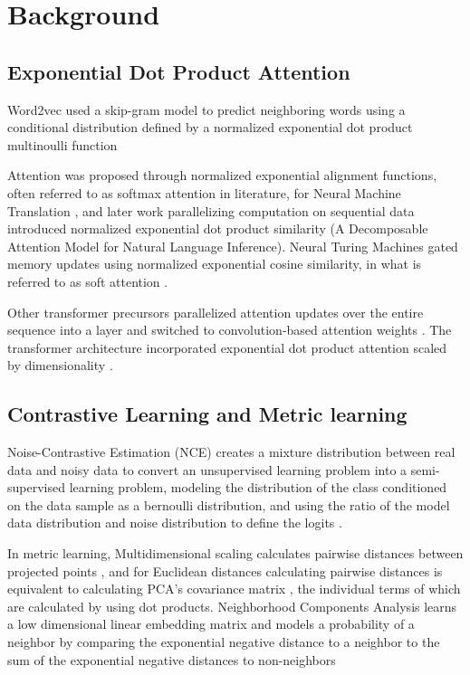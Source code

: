 \documentclass{article}
\begin{document}
\section{Background}
\label{background}

\subsection{Exponential Dot Product Attention}
Word2vec used a skip-gram model to predict neighboring words using a conditional distribution defined by a normalized exponential dot product multinoulli function \cite{DBLP:journals/corr/MikolovSCCD13}

Attention was proposed through normalized exponential alignment functions, often referred to as softmax attention in literature, for Neural Machine Translation \cite{DBLP:journals/corr/Graves13,bahdanau2014neural}, and later work parallelizing computation on sequential data introduced normalized exponential dot product similarity \cite{DBLP:journals/corr/ParikhT0U16} (A Decomposable Attention Model for Natural Language Inference).
Neural Turing Machines gated memory updates using normalized exponential cosine similarity, in what is referred to as soft attention \cite{DBLP:journals/corr/GravesWD14}.

Other transformer precursors parallelized attention updates over the entire sequence into a layer and switched to convolution-based attention weights \cite{kaiser2016neural,DBLP:journals/corr/KaiserB16}. 
The transformer architecture incorporated exponential dot product attention scaled by dimensionality \cite{vaswani2017attention}. 

\subsection{Contrastive Learning and Metric learning}
\label{contrastive}
Noise-Contrastive Estimation (NCE) creates a mixture distribution between real data and noisy data to convert an unsupervised learning problem into a semi-supervised learning problem, modeling the distribution of the class conditioned on the data sample as a bernoulli distribution, and using the ratio of the model data distribution and noise distribution to define the logits \cite{Gutmann2010}.

In metric learning, Multidimensional scaling calculates pairwise distances between projected points \cite{cox2000multidimensional}, and for Euclidean distances calculating pairwise distances is equivalent to calculating PCA's covariance matrix \cite{bishop2007}, the individual terms of which are calculated by using dot products. 
Neighborhood Components Analysis learns a low dimensional linear embedding matrix and models a probability of a neighbor by comparing the exponential negative distance to a neighbor to the sum of the exponential negative distances to non-neighbors \cite{conf/nips/GoldbergerRHS04}
\end{document}
